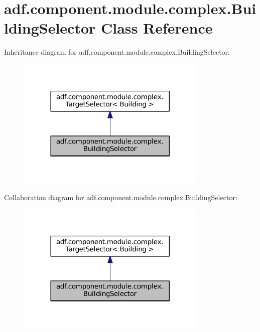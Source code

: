 \hypertarget{classadf_1_1component_1_1module_1_1complex_1_1BuildingSelector}{}\section{adf.\+component.\+module.\+complex.\+Building\+Selector Class Reference}
\label{classadf_1_1component_1_1module_1_1complex_1_1BuildingSelector}


Inheritance diagram for adf.\+component.\+module.\+complex.\+Building\+Selector\+:
\nopagebreak
\begin{figure}[H]
\begin{center}
\leavevmode
\includegraphics[width=257pt]{classadf_1_1component_1_1module_1_1complex_1_1BuildingSelector__inherit__graph}
\end{center}
\end{figure}


Collaboration diagram for adf.\+component.\+module.\+complex.\+Building\+Selector\+:
\nopagebreak
\begin{figure}[H]
\begin{center}
\leavevmode
\includegraphics[width=257pt]{classadf_1_1component_1_1module_1_1complex_1_1BuildingSelector__coll__graph}
\end{center}
\end{figure}

